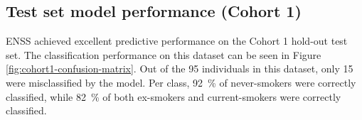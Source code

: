 \documentclass{article} %
\begin{document}

\subsection{Test set model performance (Cohort 1)} \label{sec:cohort1-performance}
ENSS achieved excellent predictive performance on the Cohort 1 hold-out test set. The classification performance on this dataset can be seen in Figure \ref{fig:cohort1-confusion-matrix}. Out of the 95 individuals in this dataset, only 15 were misclassified by the model. Per class, \SI{92}{\percent} of never-smokers were correctly classified, while \SI{82}{\percent} of both ex-smokers and current-smokers were correctly classified.
\end{document}

